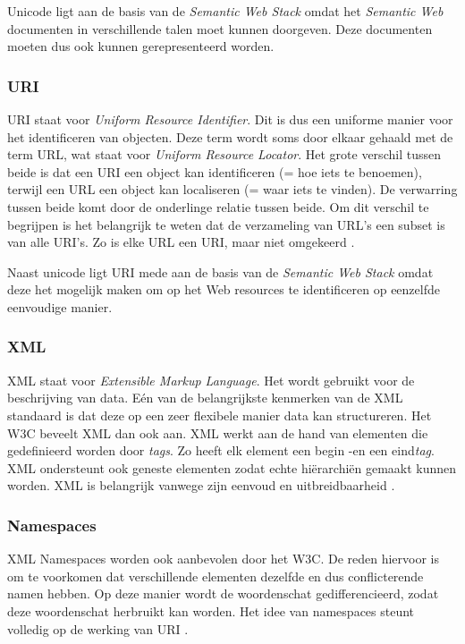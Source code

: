 Unicode ligt aan de basis van de \textit{Semantic Web Stack} omdat het \textit{Semantic Web} documenten in verschillende talen moet kunnen doorgeven. Deze documenten moeten dus ook kunnen gerepresenteerd worden.

\subsubsection{URI}
URI staat voor \textit{Uniform Resource Identifier}. Dit is dus een uniforme manier voor het identificeren van objecten. Deze term wordt soms door elkaar gehaald met de term URL, wat staat voor \textit{Uniform Resource Locator}. Het grote verschil tussen beide is dat een URI een object kan identificeren (= hoe iets te benoemen), terwijl een URL een object kan localiseren (= waar iets te vinden). De verwarring tussen beide komt door de onderlinge relatie tussen beide. Om dit verschil te begrijpen is het belangrijk te weten dat de verzameling van URL's een subset is van alle URI's. Zo is elke URL een URI, maar niet omgekeerd \cite{uri}.

Naast unicode ligt URI mede aan de basis van de \textit{Semantic Web Stack} omdat deze het mogelijk maken om op het Web resources te identificeren op eenzelfde eenvoudige manier.

\subsubsection{XML}
XML staat voor \textit{Extensible Markup Language}. Het wordt gebruikt voor de beschrijving van data. Eén van de belangrijkste kenmerken van de XML standaard is dat deze op een zeer flexibele manier data kan structureren. Het W3C beveelt XML dan ook aan. XML werkt aan de hand van elementen die gedefinieerd worden door \textit{tags}. Zo heeft elk element een begin -en een eind\textit{tag}. XML ondersteunt ook geneste elementen zodat echte hiërarchiën gemaakt kunnen worden. XML is belangrijk vanwege zijn eenvoud en uitbreidbaarheid \cite{bray2000extensible}. 

\subsubsection{Namespaces}
XML Namespaces worden ook aanbevolen door het W3C. De reden hiervoor is om te voorkomen dat verschillende elementen dezelfde en dus conflicterende namen hebben. Op deze manier wordt de woordenschat gedifferencieerd, zodat deze woordenschat herbruikt kan worden. Het idee van namespaces steunt volledig op de werking van URI \cite{bray1999namespaces}.

